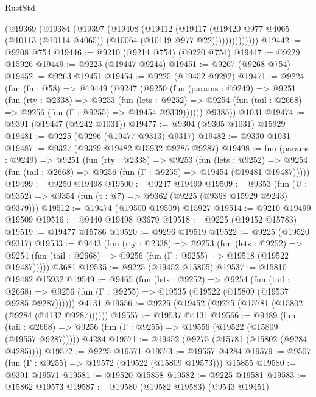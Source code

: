 \begin{lexlean}{RustStd}
\begin{coremodule}
              (@19369
                (@19384
                  (@19397
                    (@19408
                      (@19412
                        (@19417
                          (@19420
                            @977
                            @4065
                            (@10113 (@10114 @4065))
                            (@10064 (@10119 @977 @22))))))))))))))
@19442 := @9208 @754
@19446 := @9210 (@9214 @754) (@9220 @754)
@19447 := @9229 @15926
@19449 := @9225 (@19447 @9244)
@19451 := @9267 (@9268 @754)
@19452 := @9263 @19451
@19454 := @9225 (@19452 @9292)
@19471 := @9224
    (fun (fn : @58) =>
    @19449
      (@9247
        (@9250
          (fun (params : @9249) =>
          @9251
            (fun (rty : @2338) =>
            @9253
              (fun (lets : @9252) =>
              @9254 (fun (tail : @2668) => @9256 (fun (Γ : @9255) => @19454 @9339))))))
        @9385))
    @1031
@19474 := @9391 (@19447 (@9242 @1031))
@19477 := @9304 (@9305 @1031) @15929
@19481 := @9225 (@9296 (@19477 @9313) @9317)
@19482 := @9330 @1031
@19487 := @9327 (@9329 @19482 @15932 @9285 @9287)
@19498 := fun (params : @9249) =>
  @9251
    (fun (rty : @2338) =>
    @9253
      (fun (lets : @9252) =>
      @9254 (fun (tail : @2668) => @9256 (fun (Γ : @9255) => @19454 (@19481 @19487)))))
@19499 := @9250 @19498
@19500 := @9247 @19499
@19509 := @9353
    (fun (U : @9352) => @9354 (fun (t : @7) => @9362 (@9225 (@9368 @15929 @9243) @9379)))
@19512 := @19474 (@19500 @19509) @15927
@19514 := @9210 @19499 @19509
@19516 := @9440 @19498 @3679
@19518 := @9225 (@19452 @15783)
@19519 := @19477 @15786
@19520 := @9296 @19519
@19522 := @9225 (@19520 @9317)
@19533 := @9443
    (fun (rty : @2338) =>
    @9253
      (fun (lets : @9252) =>
      @9254 (fun (tail : @2668) => @9256 (fun (Γ : @9255) => @19518 (@19522 @19487)))))
    @3681
@19535 := @9225 (@19452 @15805)
@19537 := @15810 @19482 @15932
@19549 := @9465
    (fun (lets : @9252) =>
    @9254
      (fun (tail : @2668) =>
      @9256 (fun (Γ : @9255) => @19535 (@19522 (@15809 (@19537 @9285 @9287))))))
    @4131
@19556 := @9225 (@19452 (@9275 (@15781 (@15802 (@9284 (@4132 @9287))))))
@19557 := @19537 @4131
@19566 := @9489
    (fun (tail : @2668) => @9256 (fun (Γ : @9255) => @19556 (@19522 (@15809 (@19557 @9287)))))
    @4284
@19571 := @19452 (@9275 (@15781 (@15802 (@9284 @4285))))
@19572 := @9225 @19571
@19573 := @19557 @4284
@19579 := @9507 (fun (Γ : @9255) => @19572 (@19522 (@15809 @19573))) @15855
@19580 := @9391 @19571
@19581 := @19520 @15858
@19582 := @9225 @19581
@19583 := @15862 @19573
@19587 := @19580 (@19582 @19583) (@9543 @19451)

\end{coremodule}
\end{lexlean}
